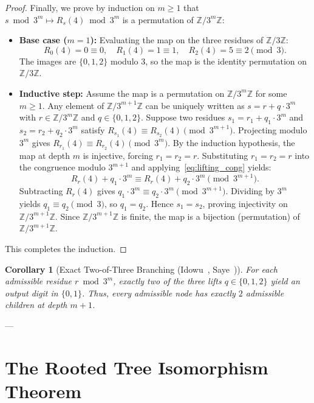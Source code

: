 \documentclass[11pt,reqno]{amsart}
\theoremstyle{plain}
\newtheorem{corollary}[theorem]{Corollary}
\theoremstyle{definition}
\theoremstyle{remark}
\newcommand{\Z}{\mathbb{Z}}
\begin{document}
\begin{proof}
Finally, we prove by induction on $m \ge 1$ that $s \bmod 3^m \mapsto R_s(4) \bmod 3^m$ is a permutation of $\Z / 3^m \Z$:
\begin{itemize}
    \item \textbf{Base case ($m = 1$):} Evaluating the map on the three residues of $\Z / 3\Z$:
    \begin{equation}
    R_0(4) = 0 \equiv 0, \quad R_1(4) = 1 \equiv 1, \quad R_2(4) = 5 \equiv 2 \pmod 3.
    \end{equation}
    The images are $\{0, 1, 2\}$ modulo $3$, so the map is the identity permutation on $\Z / 3\Z$.
    \item \textbf{Inductive step:} Assume the map is a permutation on $\Z / 3^m \Z$ for some $m \ge 1$. Any element of $\Z / 3^{m+1}\Z$ can be uniquely written as $s = r + q \cdot 3^m$ with $r \in \Z / 3^m \Z$ and $q \in \{0, 1, 2\}$. Suppose two residues $s_1 = r_1 + q_1 \cdot 3^m$ and $s_2 = r_2 + q_2 \cdot 3^m$ satisfy $R_{s_1}(4) \equiv R_{s_2}(4) \pmod{3^{m+1}}$. Projecting modulo $3^m$ gives $R_{r_1}(4) \equiv R_{r_2}(4) \pmod{3^m}$. By the induction hypothesis, the map at depth $m$ is injective, forcing $r_1 = r_2 = r$. Substituting $r_1 = r_2 = r$ into the congruence modulo $3^{m+1}$ and applying~\eqref{eq:lifting_cong} yields:
    \begin{equation}
    R_r(4) + q_1 \cdot 3^m \equiv R_r(4) + q_2 \cdot 3^m \pmod{3^{m+1}}.
    \end{equation}
    Subtracting $R_r(4)$ gives $q_1 \cdot 3^m \equiv q_2 \cdot 3^m \pmod{3^{m+1}}$. Dividing by $3^m$ yields $q_1 \equiv q_2 \pmod 3$, so $q_1 = q_2$. Hence $s_1 = s_2$, proving injectivity on $\Z / 3^{m+1}\Z$. Since $\Z / 3^{m+1}\Z$ is finite, the map is a bijection (permutation) of $\Z / 3^{m+1}\Z$.
\end{itemize}
This completes the induction.
\end{proof}

\begin{corollary}[Exact Two-of-Three Branching (Idowu~\cite{Idowu2026}, Saye~\cite{Saye2022})]\label{cor:two_of_three}
For each admissible residue $r \bmod 3^m$, exactly two of the three lifts $q \in \{0, 1, 2\}$ yield an output digit in $\{0, 1\}$. Thus, every admissible node has exactly $2$ admissible children at depth $m+1$.
\end{corollary}

---

\section{The Rooted Tree Isomorphism Theorem}\label{sec:tree_isomorphism}
\end{document}
